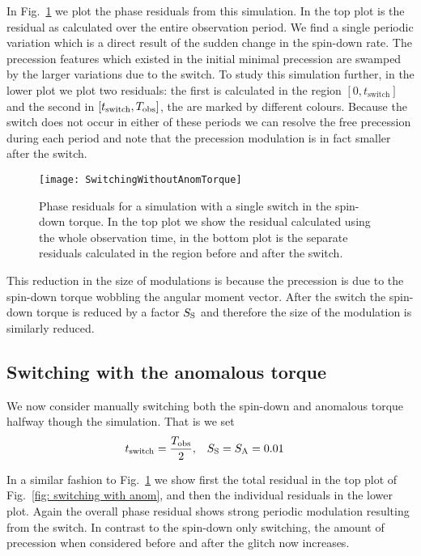 \documentclass[../full_thesis/full_thesis.tex]{subfiles}
\begin{document}
In Fig.~\ref{fig: switching without anom} we plot the phase residuals from
this simulation. In the top plot is the residual as calculated over the entire
observation period. We find a single periodic variation which is a direct result
of the sudden change in the spin-down rate. The precession features which existed
in the initial minimal precession are swamped by the larger variations due to
the switch. To study this simulation further,
in the lower plot we plot two residuals: the first is calculated
in the region $[0, t_{\mathrm{switch}}]$ and the second in $[t_{\mathrm{switch}}, T_{\textrm{obs}}]$,
the are marked by different colours.
Because the switch does not occur in either of these periods we can resolve the
free precession during each period and note that the precession modulation is
in fact smaller after the switch.
\begin{figure}[htb]
\texttt{[image: SwitchingWithoutAnomTorque]}
\caption{Phase residuals for a simulation with a single switch in the spin-down
torque. In the top plot we show the residual calculated using the whole observation
time, in the bottom plot is the separate residuals calculated in the region before
and after the switch.}
\label{fig: switching without anom}
\end{figure}
This reduction in the size of modulations is because the precession is due to
the spin-down torque wobbling the angular moment vector. After the switch the
spin-down torque is reduced by a factor $S_{\mathrm{S}}$ and therefore the size of the
modulation is similarly reduced.

\subsection{Switching with the anomalous torque}
We now consider manually switching both the spin-down and anomalous torque
halfway though the simulation.  That is we set
\begin{align}
    t_{\mathrm{switch}} = \frac{T_{\textrm{obs}}}{2}, &&& S_{\mathrm{S}} = S_{\mathrm{A}} = 0.01
\end{align}

In a similar fashion to Fig.~\ref{fig: switching without anom} we show first
the total residual in the top plot of Fig.~\ref{fig: switching with anom}, and
then the individual residuals in the lower plot. Again the overall phase residual
shows strong periodic modulation resulting from the switch. In contrast to the
spin-down only switching, the amount of precession when considered before and
after the glitch now increases.
\end{document}
